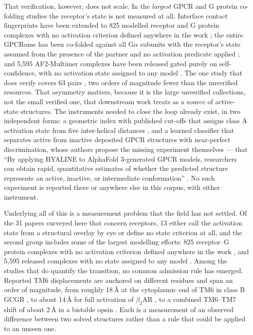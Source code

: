 That verification, however, does not scale. In the \emph{largest} GPCR and G protein co-folding studies
the receptor's state is not measured at all. Interface contact fingerprints have been extended to
825 modelled receptor and G protein complexes with no activation criterion defined anywhere in the
work \citep{matic2023gpcrome}; the entire GPCRome has been co-folded against all G$\alpha$ subunits with the
receptor's state assumed from the presence of the partner and no activation predicate applied
\citep{miglionico2026atlas}; and 5,595 AF2-Multimer complexes have been released gated purely on
self-confidence, with no activation state assigned to any model \citep{pandyszekeres2024gproteindb}. The
one study that does verify covers 63 pairs \citep{chiesa2025templatebias}, two orders of magnitude fewer
than the unverified resources. That asymmetry matters, because it is the large unverified
collections, not the small verified one, that downstream work treats as a source of active-state
structures. The instruments needed to close the loop already exist, in two
independent forms: a geometric index with published cut-offs that assigns class A activation state
from five inter-helical distances \citep{ibrahim2019a100}, and a learned classifier that separates
active from inactive deposited GPCR structures with near-perfect discrimination, whose authors
propose the missing experiment themselves --- that ``By applying HYALINE to AlphaFold 3-generated
GPCR models, researchers can obtain rapid, quantitative estimates of whether the predicted structure
represents an active, inactive, or intermediate conformation'' \citep[p.~11]{khaleq2026hyaline}. No
such experiment is reported there or anywhere else in this corpus, with either instrument.

Underlying all of this is a measurement problem that the field has not settled. Of the 31 papers
surveyed here that concern receptors, 13 either call the activation state from a structural overlay
by eye or define no state criterion at all, and the second group includes some of the largest
modelling efforts: 825 receptor--G protein complexes with no activation criterion defined anywhere
in the work \citep{matic2023gpcrome}, and 5{,}595 released complexes with no state assigned to any
model \citep{pandyszekeres2024gproteindb}. Among the studies that do quantify the transition, no
common admission rule has emerged. Reported TM6 displacements are anchored on different residues
and span an order of magnitude, from roughly 18\,\AA{} at the cytoplasmic end of TM6 in class B
GCGR \citep[p.~3]{hilger2020gcgr}, to about 14\,\AA{} for full activation of
$\beta_2$AR \citep[p.~13]{ye2026multistatebias}, to a combined TM6--TM7 shift of about
2\,\AA{} in a bistable opsin \citep{tejero2024opsin}. Each is a measurement of an observed
difference between two solved structures rather than a rule that could be applied to an unseen one.


